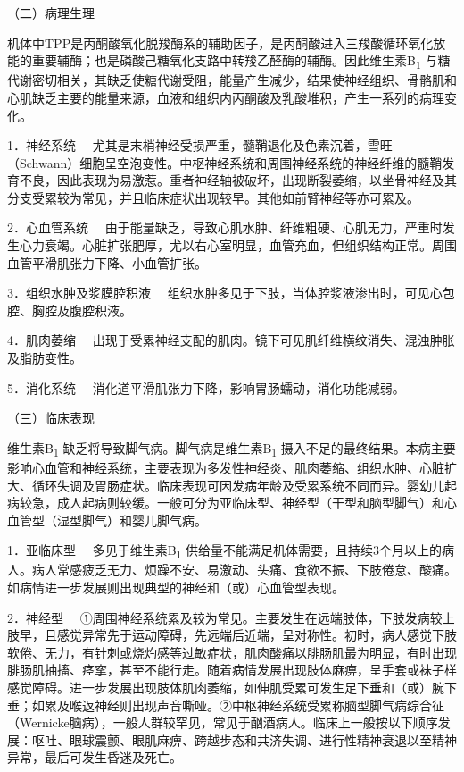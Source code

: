 （二）病理生理

机体中TPP是丙酮酸氧化脱羧酶系的辅助因子，是丙酮酸进入三羧酸循环氧化放能的重要辅酶；也是磷酸己糖氧化支路中转羧乙醛酶的辅酶。因此维生素B\textsubscript{1}
与糖代谢密切相关，其缺乏使糖代谢受阻，能量产生减少，结果使神经组织、骨骼肌和心肌缺乏主要的能量来源，血液和组织内丙酮酸及乳酸堆积，产生一系列的病理变化。

{1．神经系统}
　尤其是末梢神经受损严重，髓鞘退化及色素沉着，雪旺（Schwann）细胞呈空泡变性。中枢神经系统和周围神经系统的神经纤维的髓鞘发育不良，因此表现为易激惹。重者神经轴被破坏，出现断裂萎缩，以坐骨神经及其分支受累较为常见，并且临床症状出现较早。其他如前臂神经等亦可累及。

{2．心血管系统}
　由于能量缺乏，导致心肌水肿、纤维粗硬、心肌无力，严重时发生心力衰竭。心脏扩张肥厚，尤以右心室明显，血管充血，但组织结构正常。周围血管平滑肌张力下降、小血管扩张。

{3．组织水肿及浆膜腔积液}
　组织水肿多见于下肢，当体腔浆液渗出时，可见心包腔、胸腔及腹腔积液。

{4．肌肉萎缩}
　出现于受累神经支配的肌肉。镜下可见肌纤维横纹消失、混浊肿胀及脂肪变性。

{5．消化系统} 　消化道平滑肌张力下降，影响胃肠蠕动，消化功能减弱。

（三）临床表现

维生素B\textsubscript{1}
缺乏将导致脚气病。脚气病是维生素B\textsubscript{1}
摄入不足的最终结果。本病主要影响心血管和神经系统，主要表现为多发性神经炎、肌肉萎缩、组织水肿、心脏扩大、循环失调及胃肠症状。临床表现可因发病年龄及受累系统不同而异。婴幼儿起病较急，成人起病则较缓。一般可分为亚临床型、神经型（干型和脑型脚气）和心血管型（湿型脚气）和婴儿脚气病。

{1．亚临床型} 　多见于维生素B\textsubscript{1}
供给量不能满足机体需要，且持续3个月以上的病人。病人常感疲乏无力、烦躁不安、易激动、头痛、食欲不振、下肢倦怠、酸痛。如病情进一步发展则出现典型的神经和（或）心血管型表现。

{2．神经型}
　①周围神经系统累及较为常见。主要发生在远端肢体，下肢发病较上肢早，且感觉异常先于运动障碍，先远端后近端，呈对称性。初时，病人感觉下肢软倦、无力，有针刺或烧灼感等过敏症状，肌肉酸痛以腓肠肌最为明显，有时出现腓肠肌抽搐、痉挛，甚至不能行走。随着病情发展出现肢体麻痹，呈手套或袜子样感觉障碍。进一步发展出现肢体肌肉萎缩，如伸肌受累可发生足下垂和（或）腕下垂；如累及喉返神经则出现声音嘶哑。②中枢神经系统受累称脑型脚气病综合征（Wernicke脑病），一般人群较罕见，常见于酗酒病人。临床上一般按以下顺序发展：呕吐、眼球震颤、眼肌麻痹、跨越步态和共济失调、进行性精神衰退以至精神异常，最后可发生昏迷及死亡。

